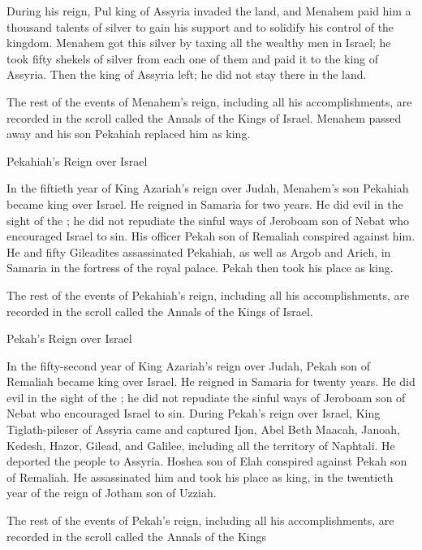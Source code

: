 {\par }{\PP During his reign,
Pul
king
of Assyria
invaded
the land,
and Menahem
paid
him
a thousand
talents
of silver
to gain
his support
and to solidify
his control
of the kingdom.
Menahem
got
this silver
by
taxing all
the wealthy men
in Israel;
he took
fifty
shekels
of silver
from each
one
of them and paid it to the king
of Assyria.
Then the king
of Assyria
left;
he did not
stay
there
in the land.
\par }{\PP {}The rest
of the events
of Menahem’s
reign, including all
his accomplishments,
are recorded
in the scroll
called the Annals
of the Kings
of Israel.
Menahem
passed away
and his son
Pekahiah
replaced
him as king.
\par }{\SH Pekahiah’s Reign over Israel
\par }{\PP {}In the fiftieth
year
of King
Azariah’s
reign
over Judah,
Menahem’s
son
Pekahiah
became king over
Israel.
He reigned in Samaria
for two years.
He did
evil
in the sight
of the
{}; he did not
repudiate
the sinful
ways of Jeroboam
son
of Nebat
who encouraged
Israel to sin.
His officer
Pekah
son
of Remaliah
conspired
against
him. He and fifty
Gileadites
assassinated
Pekahiah,
as well as Argob
and Arieh,
in Samaria
in the fortress
of the royal
palace.
Pekah then took his place
as king.
\par }{\PP {}The rest
of the events
of Pekahiah’s
reign, including all
his accomplishments,
are recorded
in the scroll
called the Annals
of the Kings
of Israel.
\par }{\SH Pekah’s Reign over Israel
\par }{\PP {}In the fifty-second
year
of King
Azariah’s
reign
over Judah,
Pekah
son
of Remaliah
became king over Israel.
He reigned in Samaria
for twenty
years.
He did
evil
in the sight
of the
{}; he did not
repudiate
the sinful
ways of Jeroboam
son
of Nebat
who encouraged
Israel to sin.
During
Pekah’s
reign over
Israel,
King
Tiglath-pileser
of Assyria
came
and captured
Ijon,
Abel Beth Maacah,
Janoah,
Kedesh,
Hazor,
Gilead,
and Galilee,
including all
the territory
of Naphtali.
He deported
the people to Assyria.
Hoshea
son
of Elah
conspired against
Pekah
son
of Remaliah.
He assassinated
him and took his place
as king,
in the twentieth
year
of the reign of Jotham
son
of Uzziah.
\par }{\PP {}The rest
of the events
of Pekah’s
reign, including all
his accomplishments,
are recorded
in the scroll
called the Annals
of the Kings
}
